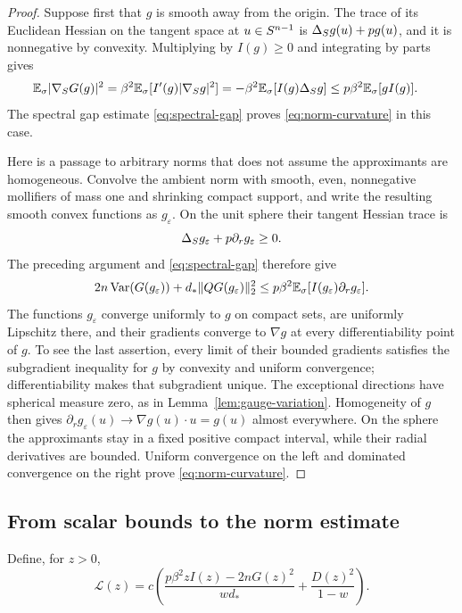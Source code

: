 \begin{proof}
Suppose first that $g$ is smooth away from the origin.  The trace of its
Euclidean Hessian on the tangent space at $u\in S^{n-1}$ is
$\Delta_S g(u)+p g(u)$, and it is nonnegative by convexity.  Multiplying by
$I(g)\ge0$ and integrating by parts gives
\begin{align*}
 \mathbb E_{\sigma}|\nabla_S G(g)|^2
 &=\beta^2\mathbb E_{\sigma}[I'(g)|\nabla_S g|^2]
 =-\beta^2\mathbb E_{\sigma}[I(g)\Delta_S g]
 \le p\beta^2\mathbb E_{\sigma}[gI(g)].
\end{align*}
The spectral gap estimate \eqref{eq:spectral-gap} proves
\eqref{eq:norm-curvature} in this case.

Here is a passage to arbitrary norms that does not assume the
approximants are homogeneous.  Convolve the ambient norm with smooth,
even, nonnegative mollifiers of mass one and shrinking compact support,
and write the resulting smooth convex functions as $g_\varepsilon$.
On the unit sphere their tangent Hessian trace is
\[
 \Delta_S g_\varepsilon+p\partial_r g_\varepsilon\ge0.
\]
The preceding argument and \eqref{eq:spectral-gap} therefore give
\[
 2n\operatorname{Var}(G(g_\varepsilon))+d_*\|QG(g_\varepsilon)\|_2^2
 \le p\beta^2\mathbb E_{\sigma}[I(g_\varepsilon)\partial_r g_\varepsilon].
\]
The functions $g_\varepsilon$ converge uniformly to $g$ on compact
sets, are uniformly Lipschitz there, and their gradients converge to
$\nabla g$ at every differentiability point of $g$.  To see the last
assertion, every limit of their bounded gradients satisfies the
subgradient inequality for $g$ by convexity and uniform convergence;
differentiability makes that subgradient unique.  The exceptional
directions have spherical measure zero, as in
Lemma~\ref{lem:gauge-variation}.  Homogeneity of $g$ then gives
$\partial_r g_\varepsilon(u)\to\nabla g(u)\cdot u=g(u)$ almost
everywhere.  On the sphere the approximants stay in a fixed positive
compact interval, while their radial derivatives are bounded.  Uniform
convergence on the left and dominated convergence on the right prove
\eqref{eq:norm-curvature}.
\end{proof}

\subsection{From scalar bounds to the norm estimate}\label{subsec:norm-deduction}

Define, for $z>0$,
\begin{equation}\label{eq:scalar-L}
 \mathcal L(z)=c\left(
 \frac{p\beta^2 zI(z)-2nG(z)^2}{wd_*}
 +\frac{D(z)^2}{1-w}\right).
\end{equation}

